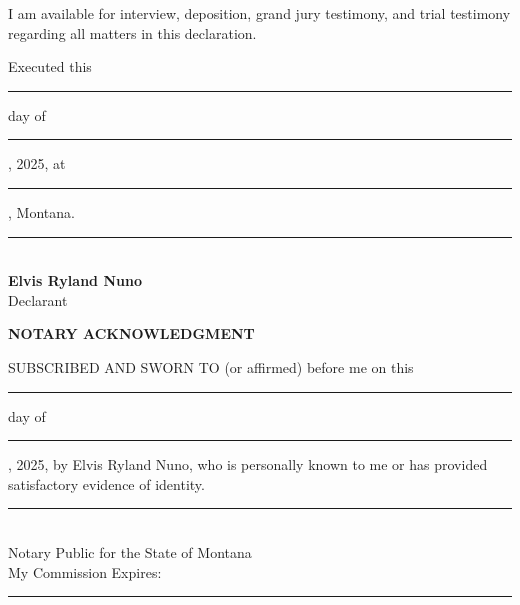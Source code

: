 \documentclass[12pt,letterpaper]{article}
\begin{document}
I am available for interview, deposition, grand jury testimony, and trial testimony regarding all matters in this declaration.

\vspace{1cm}

\noindent Executed this \rule{1in}{0.5pt} day of \rule{1.5in}{0.5pt}, 2025, at \rule{2in}{0.5pt}, Montana.

\vspace{1cm}

\noindent\rule{3.5in}{0.5pt}\\
\textbf{Elvis Ryland Nuno}\\
Declarant

\vspace{1cm}

\noindent \textbf{NOTARY ACKNOWLEDGMENT}

\vspace{0.5cm}

\noindent SUBSCRIBED AND SWORN TO (or affirmed) before me on this \rule{1in}{0.5pt} day of \rule{1.5in}{0.5pt}, 2025, by Elvis Ryland Nuno, who is personally known to me or has provided satisfactory evidence of identity.

\vspace{1cm}

\noindent\rule{3.5in}{0.5pt}\\
Notary Public for the State of Montana\\
My Commission Expires: \rule{1.5in}{0.5pt}
\end{document}
